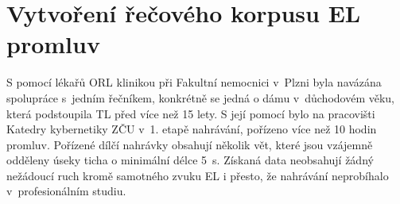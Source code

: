 \section{Vytvoření řečového korpusu EL promluv}
\label{chap:construction:corpus}



S pomocí lékařů ORL klinikou při Fakultní nemocnici v~Plzni byla navázána spolupráce s~jedním řečníkem, konkrétně se jedná o dámu v~důchodovém věku, která podstoupila TL před více než 15 lety.
S její pomocí bylo na pracovišti Katedry kybernetiky ZČU v~1. etapě nahrávání,
pořízeno více než 10 hodin promluv.
Pořízené dílčí nahrávky obsahují několik vět, které jsou vzájemně odděleny úseky ticha o minimální délce 5~s.
Získaná data neobsahují žádný nežádoucí ruch kromě samotného zvuku EL i přesto, že nahrávání neprobíhalo v~profesionálním studiu.

